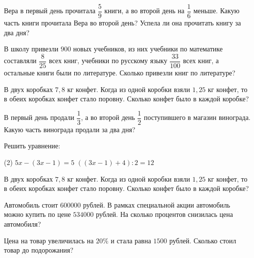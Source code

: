 \begin{class}[number=6]
	\begin{listofex}
		\item Вера в первый день прочитала \( \dfrac{5}{9} \) книги, а во второй день на \( \dfrac{1}{6} \) меньше.
		Какую часть книги прочитала Вера во второй день?
		Успела ли она прочитать книгу за два дня?
		\item В школу привезли \(900\) новых учебников, из них учебники по математике составляли \(\dfrac{8}{25}\) всех книг, учебники по русскому языку \(\dfrac{33}{100}\) всех книг, а остальные книги были по литературе. Сколько привезли книг по литературе?
	\end{listofex}
\end{class}

\begin{class}[number=7]
	\begin{listofex}
		\item В двух коробках \(7,8\) кг конфет. Когда из одной коробки взяли \(1,25\) кг конфет, то в обеих коробках конфет стало поровну. Сколько конфет было в каждой коробке?
		\item В первый день продали \(\dfrac{1}{3}\), а во второй день \(\dfrac{1}{2}\) поступившего в магазин винограда. Какую часть винограда продали за два дня?
	\end{listofex}
\end{class}

\begin{homework}[number=1]
	\begin{listofex}
		\item Решить уравнение:
		\begin{tasks}(2)
			\task \( 5x-(3x-1)=5 \)
			\task \( ((3x-1)+4):2=12\)
		\end{tasks}
		\item В двух коробках \(7,8\) кг конфет.
		Когда из одной коробки взяли \(1,25\) кг конфет, то в обеих коробках конфет стало поровну.
		Сколько конфет было в каждой коробке?
		\item Автомобиль стоит \(600000\) рублей.
		В рамках специальной акции автомобиль можно купить по цене \(534000\) рублей.
		На сколько процентов снизилась цена автомобиля?
		\item Цена на товар увеличилась на \(20\%\) и стала равна \(1500\) рублей.
		Сколько стоил товар до подорожания?
	\end{listofex}
\end{homework}

